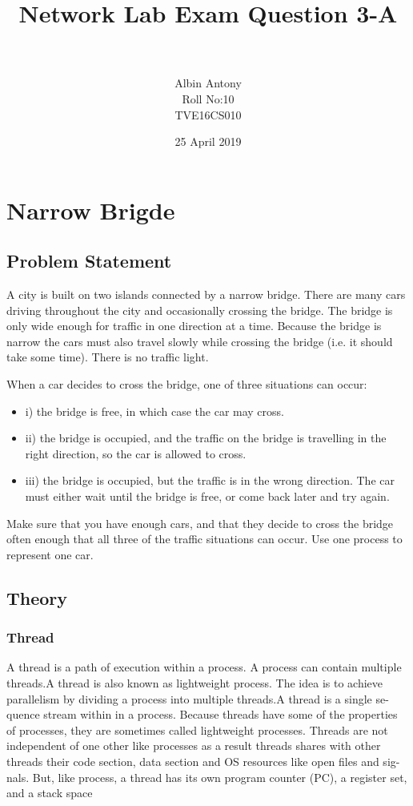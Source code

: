 \documentclass{article}
\title{\textbf{Network Lab Exam Question 3-A}}
\author{\\ \\  Albin Antony \\ Roll No:10 \\   TVE16CS010 }
\date{25 April 2019}
\begin{document}
  \maketitle
  \newpage
  \section{Narrow Brigde}
  \subsection{Problem Statement}
 A city is built on two islands connected by a narrow bridge. There are many
cars driving throughout the city and occasionally crossing the bridge. The bridge is only wide
enough for traffic in one direction at a time. Because the bridge is narrow the cars must also
travel slowly while crossing the bridge (i.e. it should take some time). There is no traffic
light.
\newline
\newline

When a car decides to cross the bridge, one of three situations can occur:
\begin{itemize}
\item i) the bridge is free, in which case the car may cross.
\item ii) the bridge is occupied, and the traffic on the bridge is travelling in the right
direction, so the car is allowed to cross.
\item iii) the bridge is occupied, but the traffic is in the wrong direction. The car must either
wait until the bridge is free, or come back later and try again.
\end{itemize}
Make sure that you have enough cars, and that they decide to cross the bridge often enough
that all three of the traffic situations can occur. Use one process to represent one car.
  
  \subsection{Theory}
 \subsubsection{Thread}
 A thread is a path of execution within a process. A process can contain multiple
threads.A thread is also known as lightweight process. The idea is to achieve
parallelism by dividing a process into multiple threads.A thread is a single se-
quence stream within in a process. Because threads have some of the properties
of processes, they are sometimes called lightweight processes. Threads are not
independent of one other like processes as a result threads shares with other
threads their code section, data section and OS resources like open files and sig-
nals. But, like process, a thread has its own program counter (PC), a register
set, and a stack space
\end{document}
